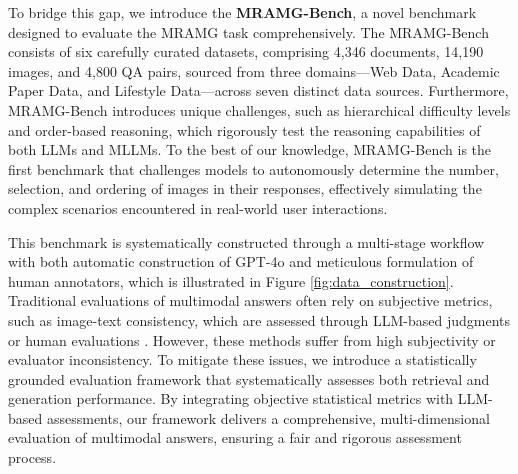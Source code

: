 To bridge this gap, we introduce the \textbf{MRAMG-Bench}, a novel benchmark designed to evaluate the MRAMG task comprehensively.
The MRAMG-Bench consists of six carefully curated datasets, comprising 4,346 documents, 14,190 images, and 4,800 QA pairs, 
sourced from three domains—Web Data, Academic Paper Data, and Lifestyle Data—across seven distinct data sources.
Furthermore, MRAMG-Bench introduces unique challenges, such as hierarchical difficulty levels and order-based reasoning, which rigorously test the reasoning capabilities of both LLMs and MLLMs.  
To the best of our knowledge, MRAMG-Bench is the first benchmark that challenges models to autonomously determine the number, selection, and ordering of images in their responses, effectively simulating the complex scenarios encountered in real-world user interactions.


This benchmark is systematically constructed through a multi-stage workflow with both automatic construction of GPT-4o and meticulous formulation of human annotators, which is illustrated in Figure \ref{fig:data_construction}. 
Traditional evaluations of multimodal answers often rely on subjective metrics, such as image-text consistency, which are assessed through LLM-based judgments or human evaluations \citep{zhang2023internlm,zhu2024murar}.
However, these methods suffer from high subjectivity or evaluator inconsistency.
To mitigate these issues, we introduce a statistically grounded evaluation framework that systematically assesses both retrieval and generation performance. By integrating objective statistical metrics with LLM-based assessments, our framework delivers a comprehensive, multi-dimensional evaluation of multimodal answers, ensuring a fair and rigorous assessment process.

